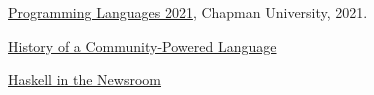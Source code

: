 \documentclass{article}
\begin{document}
\begin{thebibliography}{99}
 \href{https://github.com/alexhkurz/programming-languages-2021/blob/main/README.md}{Programming Languages 2021}, Chapman University, 2021.

\href{https://serokell.io/blog/haskell-history}{History of a Community-Powered Language}

{\href{https://www.infoq.com/presentations/haskell-newsroom-nyt/}{Haskell in the Newsroom}}

\end{thebibliography}
\end{document}

